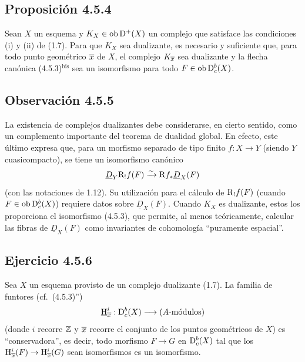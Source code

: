 \subsection*{Proposición 4.5.4}
Sean $X$ un esquema y $K_X\in\operatorname{ob}\mathrm{D}^+(X)$ un complejo que satisface las condiciones (i) y (ii) de (1.7). Para que $K_X$ sea dualizante, es necesario y suficiente que, para todo punto geométrico $\overline{x}$ de $X$, el complejo $K_{\overline{x}}$ sea dualizante y la flecha canónica (4.5.3)$^{\mathrm{bis}}$ sea un isomorfismo para todo $F\in\operatorname{ob}\mathrm{D}_c^b(X)$.

\subsection*{Observación 4.5.5}
La existencia de complejos dualizantes debe considerarse, en cierto sentido, como un complemento importante del teorema de dualidad global. En efecto, este último expresa que, para un morfismo separado de tipo finito $f:X\to Y$ (siendo $Y$ cuasicompacto), se tiene un isomorfismo canónico
\[
\underline{D}_Y\mathrm{R}_!f(F)\xrightarrow{\sim}\mathrm{R} f_*\underline{D}_X(F)
\]
(con las notaciones de 1.12). Su utilización para el cálculo de $\mathrm{R}_!f(F)$ (cuando $F\in\operatorname{ob}\mathrm{D}_c^b(X)$) requiere datos sobre $\underline{D}_X(F)$. Cuando $K_X$ es dualizante, estos los proporciona el isomorfismo (4.5.3), que permite, al menos teóricamente, calcular las fibras de $\underline{D}_X(F)$ como invariantes de cohomología ``puramente espacial''.

\subsection*{Ejercicio 4.5.6}
Sea $X$ un esquema provisto de un complejo dualizante (1.7). La familia de funtores (cf.~(4.5.3)'')
\[
\underline{\mathrm{H}}_{\overline{x}}^i:\mathrm{D}_c^b(X)\longrightarrow (A\text{-módulos})
\]
(donde $i$ recorre $\mathbb{Z}$ y $\overline{x}$ recorre el conjunto de los puntos geométricos de $X$) es ``conservadora'', es decir, todo morfismo $F\to G$ en $\mathrm{D}_c^b(X)$ tal que los $\mathrm{H}_{\overline{x}}^i(F)\to\mathrm{H}_{\overline{x}}^i(G)$ sean isomorfismos es un isomorfismo.
